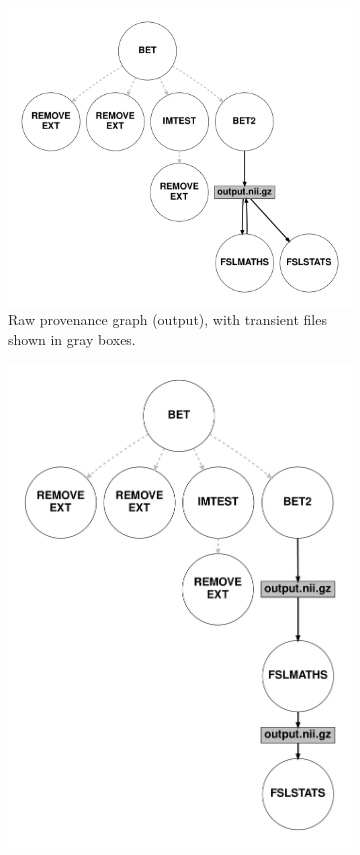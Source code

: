 \begin{figure}
  \begin{subfigure}[t]{0.3\linewidth}
    \centering
    \includegraphics[width=.9\linewidth]{chapters/chapter1/figures/p-graph.pdf}
    \caption{Raw provenance graph (\reprozip output), with transient files shown in gray boxes.}
    \label{fig:provenance-graph}
  \end{subfigure}
  \hfill
  \begin{subfigure}[t]{0.3\linewidth}
    \centering
    \includegraphics[width=.7\linewidth]{chapters/chapter1/figures/p-graph-dag.pdf}

\end{subfigure}
\end{figure}
